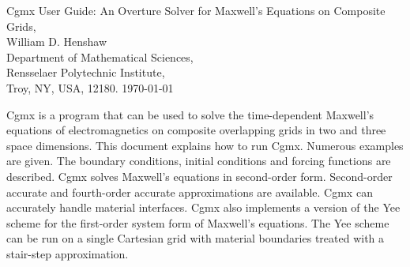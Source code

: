 \documentclass{article}
\begin{document}


\def\ud     {{    U}}
\def\pd     {{    P}}

\newcommand{\mbar}{\bar{m}}
\newcommand{\Rbar}{\bar{R}}
\newcommand{\Ru}{R_u}         %
\newcommand{\Div}{\grad\cdot}
\newcommand{\tauv}{\boldsymbol{\tau}}
\newcommand{\sumi}{\sum_{i=1}^n}
\newcommand{\dt}{{\Delta t}}
\newcommand{\eps}{\epsilon}

\baselineskip
\begin{flushleft}
{\Large
Cgmx User Guide: An Overture Solver for Maxwell's Equations on Composite Grids, \\
}
\vspace{2\baselineskip}
William D. Henshaw  \\
Department of Mathematical Sciences, \\
Rensselaer Polytechnic Institute, \\
Troy, NY, USA, 12180.
\vspace{\baselineskip}
\today\\
\vspace{\baselineskip}

\vspace{4\baselineskip}


Cgmx is a program that can be used to solve the time-dependent Maxwell's equations
of electromagnetics on composite overlapping grids in two and three space
dimensions. This document explains how to run Cgmx. Numerous examples are
given. The boundary conditions, initial conditions and forcing functions 
are described.
Cgmx solves Maxwell's equations in second-order form. Second-order
accurate and fourth-order accurate approximations are available. Cgmx can
accurately handle material interfaces.  Cgmx also implements a version of the
Yee scheme for the first-order system form of Maxwell's equations. The Yee
scheme can be run on a single Cartesian grid with material boundaries treated
with a stair-step approximation.

\end{flushleft}
\end{document}
